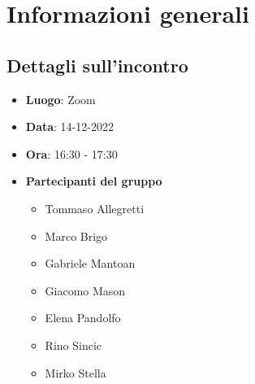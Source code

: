 \section{Informazioni generali}

\subsection{Dettagli sull'incontro}
\begin{itemize}
    \item \textbf{Luogo}: Zoom
    \item \textbf{Data}: 14-12-2022
    \item \textbf{Ora}: 16:30 - 17:30
    \item \textbf{Partecipanti del gruppo}
        \begin{itemize}
            \item Tommaso Allegretti
            \item Marco Brigo
            \item Gabriele Mantoan
            \item Giacomo Mason
            \item Elena Pandolfo
            \item Rino Sincic
            \item Mirko Stella
        \end{itemize}
\end{itemize}


